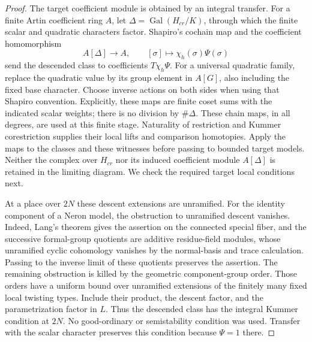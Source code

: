 \begin{proof}
The target coefficient module is obtained by an integral transfer.
For a finite Artin coefficient ring \(A\), let
\(\Delta=\operatorname{Gal}(H_{cr}/K)\), through which the
finite scalar and quadratic characters factor.  Shapiro's
cochain map and the coefficient homomorphism
\[
 A[\Delta]\longrightarrow A,\qquad
 [\sigma]\longmapsto\chi_h(\sigma)\Psi(\sigma)
 \]
send the descended class to coefficients \(T\chi_h\Psi\).
For a universal quadratic family, replace the quadratic
value by its group element in \(A[G]\), also including the
fixed base character.  Choose inverse actions on both
sides when using that Shapiro convention.  Explicitly,
these maps are finite coset sums with the indicated scalar
weights; there is no division by \(\#\Delta\).
These chain maps, in all degrees, are used at this finite stage.
Naturality of restriction and Kummer corestriction supplies their local
lifts and comparison homotopies.  Apply the maps to the classes and
these witnesses before passing to bounded target models.  Neither
the complex over \(H_{cr}\) nor its induced coefficient module
\(A[\Delta]\) is retained in the limiting diagram.  We check the
required target local conditions next.

At a place over \(2N\) these descent extensions are unramified.
For the identity component of a Neron model, the obstruction to
unramified descent vanishes.  Indeed, Lang's theorem gives the assertion
on the connected special fiber, and the successive formal-group
quotients are additive residue-field modules, whose unramified cyclic
cohomology vanishes by the normal-basis and trace calculation.
Passing to the inverse limit of these quotients preserves the assertion.
The remaining obstruction is killed by the geometric component-group
order.  Those orders have a uniform bound over unramified extensions
of the finitely many fixed local twisting types.  Include their product,
the descent factor, and the parametrization factor in \(L\).
Thus the descended class has the integral Kummer condition at \(2N\).
No good-ordinary or semistability condition was used.  Transfer with
the scalar character preserves this condition because \(\Psi=1\)
there.


\end{proof}

